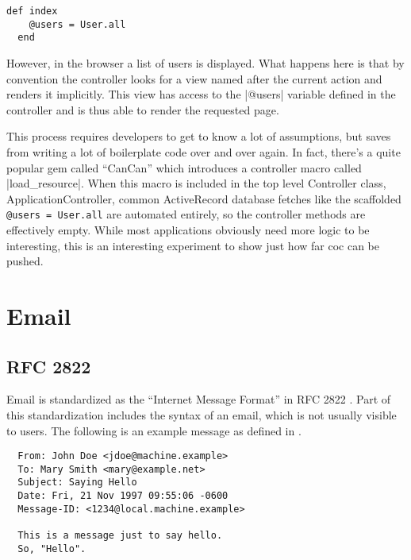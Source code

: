 \begin{lstlisting}[escapechar=!]
  def index
    @users = User.all
  end
\end{lstlisting}

However, in the browser a list of users is displayed. What happens here is that by convention the controller looks for a view named after the current action and renders it implicitly. This view has access to the |@users| variable defined in the controller and is thus able to render the requested page.

This process requires developers to get to know a lot of assumptions, but saves from writing a lot of boilerplate code over and over again. In fact, there's a quite popular \gls{gem} called ``CanCan'' which introduces a controller macro called |load_resource|. When this macro is included in the top level Controller class, ApplicationController, common ActiveRecord database fetches like the scaffolded \lstinline{@users = User.all} are automated entirely, so the controller methods are effectively empty. While most applications obviously need more logic to be interesting, this is an interesting experiment to show just how far \acrlong{coc} can be pushed.

\section{Email}

\subsection{RFC 2822}

Email is standardized as the ``Internet Message Format'' in RFC 2822 \citep{email}. Part of this standardization includes the syntax of an email, which is not usually visible to users. The following is an example message as defined in \citep[44]{email}.

\begin{lstlisting}
  From: John Doe <jdoe@machine.example>
  To: Mary Smith <mary@example.net>
  Subject: Saying Hello
  Date: Fri, 21 Nov 1997 09:55:06 -0600
  Message-ID: <1234@local.machine.example>
  
  This is a message just to say hello.
  So, "Hello".
\end{lstlisting}

